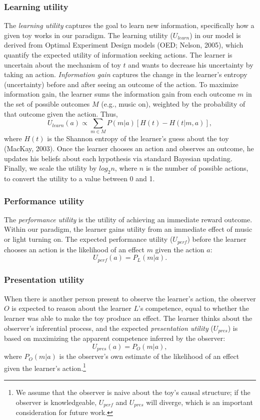 \documentclass[10pt, letterpaper]{article}
\begin{document}
\subsubsection{Learning utility}\label{learning-utility}

The \emph{learning utility} captures the goal to learn new information,
specifically how a given toy works in our paradigm. The learning utility
(\(U_{learn}\)) in our model is derived from Optimal Experiment Design
models (OED; Nelson, 2005), which quantify the expected utility of
information seeking actions. The learner is uncertain about the
mechanism of toy \(t\) and wants to decrease his uncertainty by taking
an action. \emph{Information gain} captures the change in the learner's
entropy (uncertainty) before and after seeing an outcome of the action.
To maximize information gain, the learner sums the information gain from
each outcome \(m\) in the set of possible outcomes \(M\) (e.g., music
on), weighted by the probability of that outcome given the action. Thus,
\[ U_{learn}(a) \propto \sum_{m \in M}{P(m|a)}[{H(t) - H(t | m,a)}],\]
\noindent
where \(H(t)\) is the Shannon entropy of the learner's guess about the
toy (MacKay, 2003). Once the learner chooses an action and observes an
outcome, he updates his beliefs about each hypothesis via standard
Bayesian updating. Finally, we scale the utility by \(log_2n\), where
\(n\) is the number of possible actions, to convert the utility to a
value between 0 and 1.

\subsubsection{Performance utility}\label{performance-utility}

The \emph{performance utility} is the utility of achieving an immediate
reward outcome. Within our paradigm, the learner gains utility from an
immediate effect of music or light turning on. The expected performance
utility (\(U_{perf}\)) before the learner chooses an action is the
likelihood of an effect \(m\) given the action \(a\):
\[ U_{perf}(a) = P_L(m | a).\] \noindent

\subsubsection{Presentation utility}\label{presentation-utility}

When there is another person present to observe the learner's action,
the observer \(O\) is expected to reason about the learner \(L\)'s
competence, equal to whether the learner was able to make the toy
produce an effect. The learner thinks about the observer's inferential
process, and the expected \emph{presentation utility} (\(U_{pres}\)) is
based on maximizing the apparent competence inferred by the observer:
\[ U_{pres}(a) = P_O(m | a),\] \noindent
where \(P_O(m | a)\) is the observer's own estimate of the likelihood of
an effect given the learner's action.\footnote{We assume that the
  observer is naive about the toy's causal structure; if the observer is
  knowledgeable, \(U_{perf}\) and \(U_{pres}\) will diverge, which is an
  important consideration for future work.}
\end{document}

